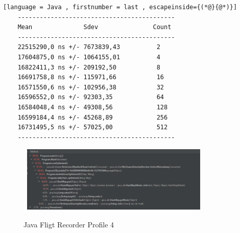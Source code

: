 \begin{lstlisting}[language = Java , firstnumber = last , escapeinside={(*@}{@*)}]
    -------------------------------------------
    Mean              Sdev               Count
    -------------------------------------------
    22515290,0 ns +/- 7673839,43          2
    17604875,0 ns +/- 1064155,01          4
    16822411,3 ns +/- 209192,50           8
    16691758,8 ns +/- 115971,66           16
    16571550,6 ns +/- 102956,38           32
    16596552,0 ns +/- 92303,35            64
    16584048,4 ns +/- 49308,56            128
    16599184,4 ns +/- 45268,89            256
    16731495,5 ns +/- 57025,00            512
    -------------------------------------------
\end{lstlisting}

\begin{figure}[H]
    \centering\
    \includegraphics[width = 0.8\textwidth ]{figures/profile4.PNG}
    \caption{Java Fligt Recorder Profile 4}
    \label{fig:p4}
\end{figure}



\newpage
\vspace{0.5cm}


